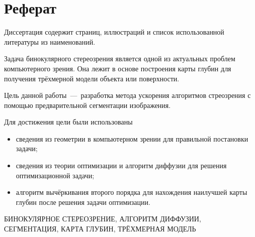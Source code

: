\chapter*{Реферат}

Диссертация содержит \pageref{LastPage} страниц,
 иллюстраций и список использованной литературы из
 наименований.

Задача бинокулярного стереозрения
является одной из актуальных проблем компьютерного зрения.
Она лежит в основе построения карты глубин для получения трёхмерной
модели объекта или поверхности.

Цель данной работы~---~разработка метода ускорения
алгоритмов стреозрения с помощью
предварительной сегментации изображения.

Для достижения цели были использованы
\begin{itemize}
  \item сведения из геометрии
        в компьютерном зрении для правильной постановки задачи;
  \item сведения из теории оптимизации и
        алгоритм диффузии для решения оптимизационной задачи;
  \item алгоритм вычёркивания второго порядка для нахождения наилучшей
  карты глубин после решения задачи оптимизации.
\end{itemize}

\MakeUppercase{бинокулярное стереозрение,
               алгоритм диффузии,
               сегментация,
               карта глубин,
               трёхмерная модель}
